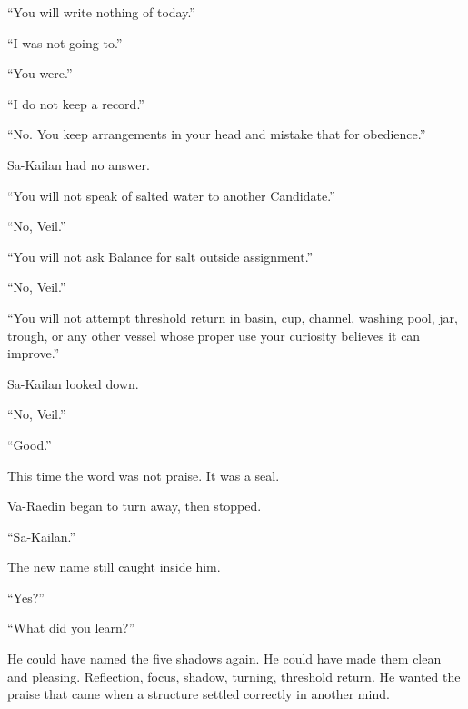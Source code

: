 “You will write nothing of today.”\par

“I was not going to.”\par

“You were.”\par

“I do not keep a record.”\par

“No.
You keep arrangements in your head and mistake that for obedience.”\par

Sa-Kailan had no answer.\par

“You will not speak of salted water to another Candidate.”\par

“No, Veil.”\par

“You will not ask Balance for salt outside assignment.”\par

“No, Veil.”\par

“You will not attempt threshold return in basin, cup, channel, washing pool, jar, trough, or any other vessel whose proper use your curiosity believes it can improve.”\par

Sa-Kailan looked down.\par

“No, Veil.”\par

“Good.”\par

This time the word was not praise.
It was a seal.\par

Va-Raedin began to turn away, then stopped.\par

“Sa-Kailan.”\par

The new name still caught inside him.\par

“Yes?”\par

“What did you learn?”\par

He could have named the five shadows again.
He could have made them clean and pleasing.
Reflection, focus, shadow, turning, threshold return.
He wanted the praise that came when a structure settled correctly in another mind.\par

